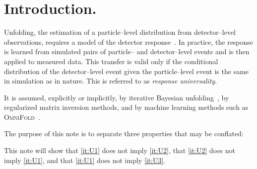 \documentclass[12pt]{article}
\newcommand{\1}{\mathbbm{1}}
\renewcommand{\[}{\begin{equation}}
\renewcommand{\]}{\end{equation}}
\begin{document}
\section{Introduction.}
\label{sec:intro}

    Unfolding, the estimation of a particle--level distribution from detector--level observations, requires a model of the detector response~\cite{Cowan:2002in,Blobel:2011fih}.
    In practice, the response is learned from simulated pairs of particle-- and detector--level events and is then applied to measured data.
    This transfer is valid only if the conditional distribution of the detector--level event given the particle--level event is the same in simulation as in nature.
    This is referred to as \emph{response universality}.
    
    It is assumed, explicitly or implicitly, by iterative Bayesian unfolding~\cite{DAgostini:1994fjx}, by regularized matrix inversion methods, and by machine learning methods such as \textsc{OmniFold}~\cite{Andreassen:2019cjw,Arratia:2021otl}.

    The purpose of this note is to separate three properties that may be conflated:
    
    This note will show that \cref{it:U1} does not imply \cref{it:U2}, that \cref{it:U2} does not imply \cref{it:U1}, and that \cref{it:U1} does not imply \cref{it:U3}.
\end{document}
